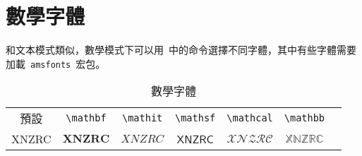\section{數學字體}
和文本模式類似，數學模式下可以用~中的命令選擇不同字體，其中有些字體需要加載~\verb|amsfonts|~宏包。

\begin{table}[htbp]
\caption{數學字體}
\label{tab:math_font}
\centering
\begin{tabular}{ccccccc}
    \toprule
    預設 & \verb|\mathbf| & \verb|\mathit| & \verb|\mathsf| & 
        \verb|\mathcal| & \verb|\mathbb| \\
    XNZRC & $\mathbf{XNZRC}$ & $\mathit{XNZRC}$ & $\mathsf{XNZRC}$ & 
        $\mathcal{XNZRC}$ & $\mathbb{XNZRC}$ \\
    \bottomrule
\end{tabular}
\end{table}



\newpage



